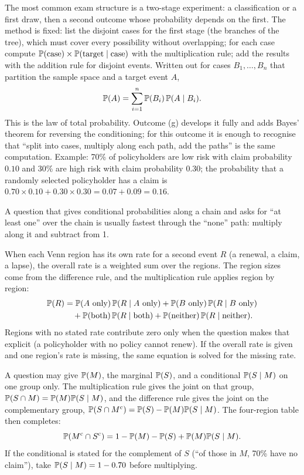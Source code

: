 The most common exam structure is a two-stage experiment: a classification or a first draw, then a
second outcome whose probability depends on the first. The method is fixed: list the disjoint cases
for the first stage (the branches of the tree), which must cover every possibility without
overlapping; for each case compute $\mathbb{P}(\text{case}) \times \mathbb{P}(\text{target} \mid \text{case})$
with the multiplication rule; add the results with the addition rule for disjoint events.
Written out for cases $B_1, \dots, B_n$ that partition the sample space and a target event $A$,
\[
\mathbb{P}(A) = \sum_{i=1}^{n} \mathbb{P}(B_i)\,\mathbb{P}(A \mid B_i).
\]
This is the law of total probability. Outcome (g) develops it fully and adds Bayes' theorem for
reversing the conditioning; for this outcome it is enough to recognise that ``split into cases,
multiply along each path, add the paths'' is the same computation. Example: 70\% of policyholders
are low risk with claim probability $0.10$ and 30\% are high risk with claim probability $0.30$;
the probability that a randomly selected policyholder has a claim is
$0.70 \times 0.10 + 0.30 \times 0.30 = 0.07 + 0.09 = 0.16$.

A question that gives conditional probabilities along a chain and asks for ``at least one'' over
the chain is usually fastest through the ``none'' path: multiply along it and subtract from 1.

\begin{keyfact}
When each Venn region has its own rate for a second event $R$ (a renewal, a claim, a lapse),
the overall rate is a weighted sum over the regions. The region sizes come from the difference
rule, and the multiplication rule applies region by region:
\begin{align*}
\mathbb{P}(R) &= \mathbb{P}(A \text{ only})\,\mathbb{P}(R \mid A \text{ only})
 + \mathbb{P}(B \text{ only})\,\mathbb{P}(R \mid B \text{ only})\\
 &\quad + \mathbb{P}(\text{both})\,\mathbb{P}(R \mid \text{both})
 + \mathbb{P}(\text{neither})\,\mathbb{P}(R \mid \text{neither}).
\end{align*}
Regions with no stated rate contribute zero only when the question makes that explicit (a
policyholder with no policy cannot renew). If the overall rate is given and one region's rate is
missing, the same equation is solved for the missing rate.
\end{keyfact}

\begin{keyfact}
A question may give $\mathbb{P}(M)$, the marginal $\mathbb{P}(S)$, and a conditional $\mathbb{P}(S \mid M)$ on one
group only. The multiplication rule gives the joint on that group, $\mathbb{P}(S \cap M) =
\mathbb{P}(M)\mathbb{P}(S \mid M)$, and the difference rule gives the joint on the complementary group,
$\mathbb{P}(S \cap M^{\mathrm{c}}) = \mathbb{P}(S) - \mathbb{P}(M)\mathbb{P}(S \mid M)$. The four-region table then completes:
\[
\mathbb{P}(M^{\mathrm{c}} \cap S^{\mathrm{c}}) = 1 - \mathbb{P}(M) - \mathbb{P}(S) + \mathbb{P}(M)\mathbb{P}(S \mid M).
\]
If the conditional is stated for the complement of $S$ (``of those in $M$, 70\% have no claim''),
take $\mathbb{P}(S \mid M) = 1 - 0.70$ before multiplying.
\end{keyfact}

